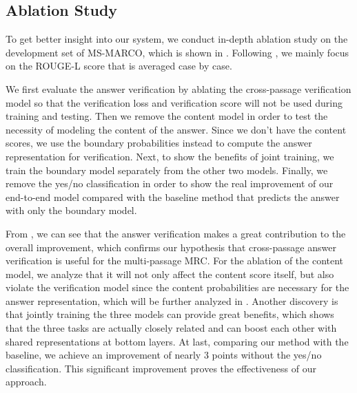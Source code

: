 \subsection{Ablation Study}





To get better insight into our system, we conduct in-depth ablation study on the development set of MS-MARCO, which is shown in . Following , we mainly focus on the ROUGE-L score that is averaged case by case. 

We first evaluate the answer verification by ablating the cross-passage verification model so that the verification loss and verification score will not be used during training and testing. Then we remove the content model in order to test the necessity of modeling the content of the answer. Since we don't have the content scores, we use the boundary probabilities instead to compute the answer representation for verification. Next, to show the benefits of joint training, we train the boundary model separately from the other two models. Finally, we remove the yes/no classification in order to show the real improvement of our end-to-end model compared with the baseline method that predicts the answer with only the boundary model. 

From , we can see that the answer verification makes a great contribution to the overall improvement, which confirms our hypothesis that cross-passage answer verification is useful for the multi-passage MRC. For the ablation of the content model, we analyze that it will not only affect the content score itself, but also violate the verification model since the content probabilities are necessary for the answer representation, which will be further analyzed in . Another discovery is that jointly training the three models can provide great benefits, which shows that the three tasks are actually closely related and can boost each other with shared representations at bottom layers. At last, comparing our method with the baseline, we achieve an improvement of nearly 3 points without the yes/no classification. This significant improvement proves the effectiveness of our approach.

